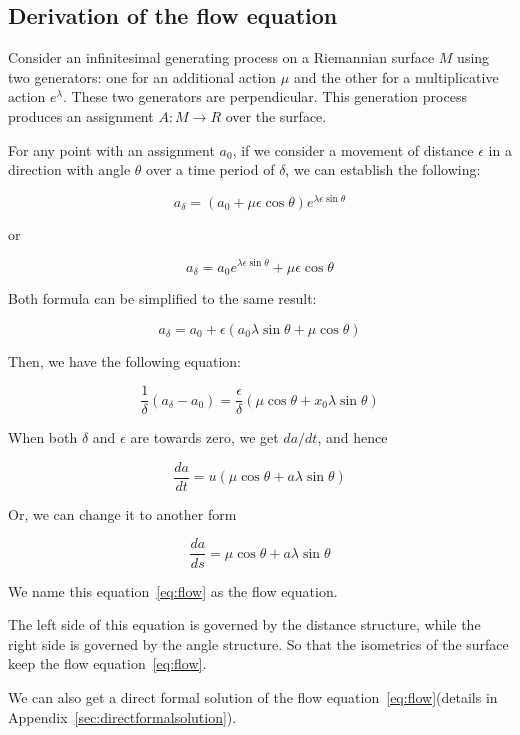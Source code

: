 \subsection{Derivation of the flow equation}\label{sec:equation}

Consider an infinitesimal generating process on a Riemannian surface $M$ using two generators:
one for an additional action $\mu$ and the other for a multiplicative action $e^\lambda$.
These two generators are perpendicular.
This generation process produces an assignment $A: M \to R$ over the surface.

For any point with an assignment $a_0$, if we consider a movement of distance $\epsilon$ in a direction with angle $\theta$
over a time period of $\delta$, we can establish the following:

\[
    a_{\delta} = (a_0 + \mu \epsilon \cos \theta)e^{\lambda \epsilon \sin \theta}
\]

or

\[
    a_{\delta} = a_0 e^{\lambda \epsilon \sin \theta} + \mu \epsilon \cos \theta
\]

Both formula can be simplified to the same result:

\[
    a_{\delta} = a_0 + \epsilon (a_0 \lambda \sin \theta + \mu \cos \theta)
\]

Then, we have the following equation:

\[
    \frac{1}{\delta} (a_{\delta} - a_0) = \frac{\epsilon}{\delta} (\mu \cos \theta + x_0 \lambda \sin \theta)
\]

When both $\delta$ and $\epsilon$ are towards zero, we get $da / dt$, and hence

\[
    \frac{da}{dt} = u (\mu \cos \theta + a \lambda \sin \theta)
\]

Or, we can change it to another form

\begin{equation}
    \frac{da}{ds} = \mu \cos \theta + a \lambda \sin \theta\label{eq:flow}
\end{equation}

We name this equation~\eqref{eq:flow} as the flow equation.

The left side of this equation is governed by the distance structure, while the right side is governed by the angle structure.
So that the isometrics of the surface keep the flow equation~\eqref{eq:flow}.

We can also get a direct formal solution of the flow equation~\eqref{eq:flow}(details in Appendix~\ref{sec:directformalsolution}).

